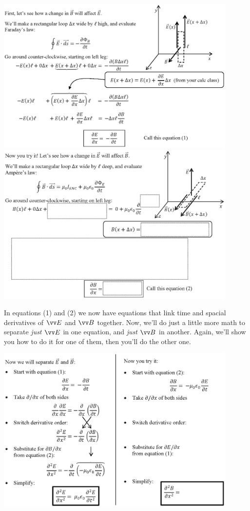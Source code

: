 \vspace{-0.1in}
\includegraphics[width=0.9\textwidth]{deriving_em_waves/change_in_B.eps} \newline
\underline{\hspace{\textwidth}}
\includegraphics[width=0.9\textwidth]{deriving_em_waves/change_in_E_bw.eps}
\newpage

In equations (1) and (2) we now have equations that link time and spacial derivatives of $\vv E$ and $\vv B$ together.  Now, we'll do just a little more math to separate \textit{just} $\vv E$ in one equation, and \textit{just} $\vv B$ in another.  Again, we'll show you how to do it for one of them, then you'll do the other one.
\vspace{-0.2in}

\begin{center}
    \includegraphics[width=0.9\textwidth]{deriving_em_waves/separate_E_and_B.eps} 
 \end{center}
\vspace{-0.2in}

